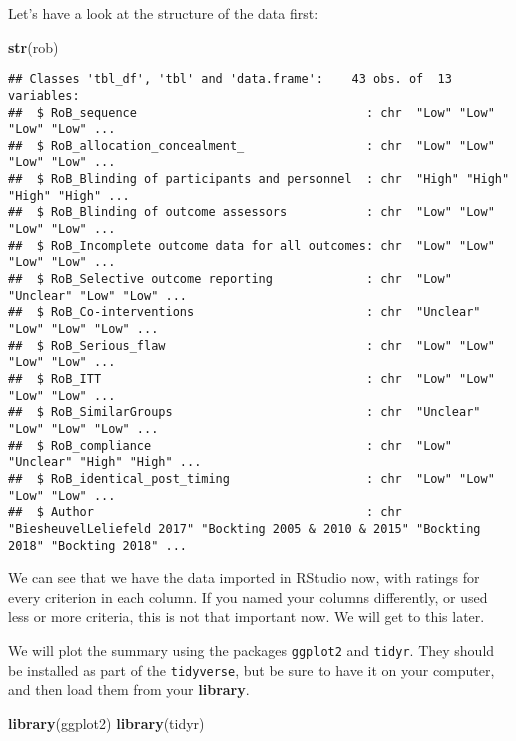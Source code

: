 \documentclass[]{book}
\newenvironment{Shaded}{\begin{snugshade}}{\end{snugshade}}
\newcommand{\KeywordTok}[1]{\textcolor[rgb]{0.13,0.29,0.53}{\textbf{#1}}}
\newcommand{\NormalTok}[1]{#1}
\theoremstyle{definition}
\theoremstyle{definition}
\theoremstyle{definition}
\theoremstyle{remark}
\begin{document}
Let's have a look at the structure of the data first:

\begin{Shaded}
\begin{Highlighting}[]
\KeywordTok{str}\NormalTok{(rob)}
\end{Highlighting}
\end{Shaded}

\begin{verbatim}
## Classes 'tbl_df', 'tbl' and 'data.frame':    43 obs. of  13 variables:
##  $ RoB_sequence                                : chr  "Low" "Low" "Low" "Low" ...
##  $ RoB_allocation_concealment_                 : chr  "Low" "Low" "Low" "Low" ...
##  $ RoB_Blinding of participants and personnel  : chr  "High" "High" "High" "High" ...
##  $ RoB_Blinding of outcome assessors           : chr  "Low" "Low" "Low" "Low" ...
##  $ RoB_Incomplete outcome data for all outcomes: chr  "Low" "Low" "Low" "Low" ...
##  $ RoB_Selective outcome reporting             : chr  "Low" "Unclear" "Low" "Low" ...
##  $ RoB_Co-interventions                        : chr  "Unclear" "Low" "Low" "Low" ...
##  $ RoB_Serious_flaw                            : chr  "Low" "Low" "Low" "Low" ...
##  $ RoB_ITT                                     : chr  "Low" "Low" "Low" "Low" ...
##  $ RoB_SimilarGroups                           : chr  "Unclear" "Low" "Low" "Low" ...
##  $ RoB_compliance                              : chr  "Low" "Unclear" "High" "High" ...
##  $ RoB_identical_post_timing                   : chr  "Low" "Low" "Low" "Low" ...
##  $ Author                                      : chr  "BiesheuvelLeliefeld 2017" "Bockting 2005 & 2010 & 2015" "Bockting 2018" "Bockting 2018" ...
\end{verbatim}

We can see that we have the data imported in RStudio now, with ratings
for every criterion in each column. If you named your columns
differently, or used less or more criteria, this is not that important
now. We will get to this later.

We will plot the summary using the packages \texttt{ggplot2} and
\texttt{tidyr}. They should be installed as part of the
\texttt{tidyverse}, but be sure to have it on your computer, and then
load them from your \textbf{library}.

\begin{Shaded}
\begin{Highlighting}[]
\KeywordTok{library}\NormalTok{(ggplot2)}
\KeywordTok{library}\NormalTok{(tidyr)}
\end{Highlighting}
\end{Shaded}
\end{document}
